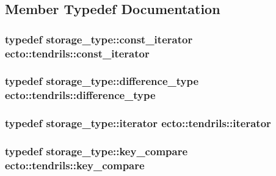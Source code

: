 \subsection{\-Member \-Typedef \-Documentation}
\hypertarget{classecto_1_1tendrils_a86df9983555ca4ebdae8b1d36aa4bbd8}{
\subsubsection[{const\-\_\-iterator}]{\setlength{\rightskip}{0pt plus 5cm}typedef storage\-\_\-type\-::const\-\_\-iterator {\bf ecto\-::tendrils\-::const\-\_\-iterator}}}\label{classecto_1_1tendrils_a86df9983555ca4ebdae8b1d36aa4bbd8}
\hypertarget{classecto_1_1tendrils_a919b9a4666ad641148b6a432a1fd08fb}{
\subsubsection[{difference\-\_\-type}]{\setlength{\rightskip}{0pt plus 5cm}typedef storage\-\_\-type\-::difference\-\_\-type {\bf ecto\-::tendrils\-::difference\-\_\-type}}}\label{classecto_1_1tendrils_a919b9a4666ad641148b6a432a1fd08fb}
\hypertarget{classecto_1_1tendrils_a6f0b7bd6e3a03f047351303630b889e0}{
\subsubsection[{iterator}]{\setlength{\rightskip}{0pt plus 5cm}typedef storage\-\_\-type\-::iterator {\bf ecto\-::tendrils\-::iterator}}}\label{classecto_1_1tendrils_a6f0b7bd6e3a03f047351303630b889e0}
\hypertarget{classecto_1_1tendrils_aa347bebda44153437e8554a25bed9e6b}{
\subsubsection[{key\-\_\-compare}]{\setlength{\rightskip}{0pt plus 5cm}typedef storage\-\_\-type\-::key\-\_\-compare {\bf ecto\-::tendrils\-::key\-\_\-compare}}}\label{classecto_1_1tendrils_aa347bebda44153437e8554a25bed9e6b}
